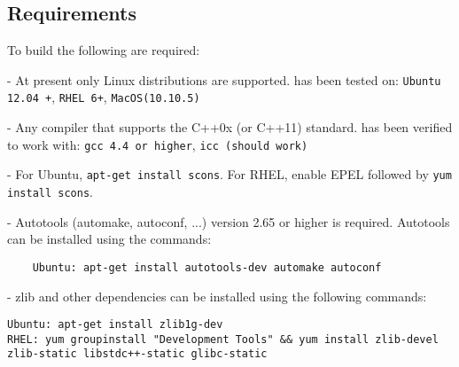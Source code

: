 \subsection{Requirements}

To build \SIM the following are required:

\begingroup
\renewcommand\descriptionlabel[1]{\textit{\hspace\labelsep{#1}}}
\begin{description}\firmlist
  \item[Operating System]- At present only Linux distributions are supported. \SIM has been tested on:
   \Verb!Ubuntu 12.04 +!, \Verb!RHEL 6+!, \Verb+MacOS(10.10.5)+
  \item[Compiler]- Any compiler that supports the C++0x (or C++11)
    standard. \SIM has been verified to work with: \Verb+gcc 4.4 or higher+, \Verb+icc (should work)+
  \item[SConstruct]- For Ubuntu, \Verb+apt-get install scons+. For RHEL, enable EPEL followed by \Verb+yum install scons+. 

\ignore
	 {
	  \item[Autotools] - Autotools (automake, autoconf,
		...) version 2.65 or higher is required. Autotools can be installed using the commands:
	\begin{Verbatim}
	Ubuntu: apt-get install autotools-dev automake autoconf
	\end{Verbatim}
	}
  
  \item[Libraries]- zlib and other dependencies can be installed using the following commands:
\begin{Verbatim}
Ubuntu: apt-get install zlib1g-dev
RHEL: yum groupinstall "Development Tools" && yum install zlib-devel zlib-static libstdc++-static glibc-static 
\end{Verbatim}
\end{description}
\endgroup




